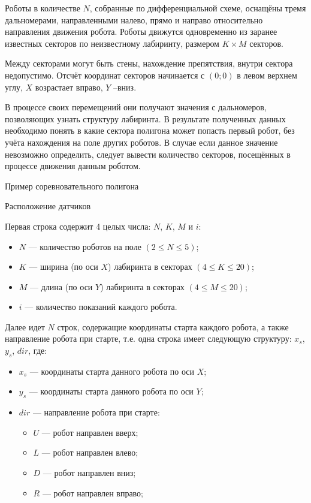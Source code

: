 
Роботы в количестве $N$, собранные по дифференциальной схеме, оснащёны тремя дальномерами, направленными налево, прямо и
направо относительно направления движения робота.
Роботы движутся одновременно  из заранее известных секторов по неизвестному лабиринту, размером $K \times M$ секторов.

Между секторами могут быть стены, нахождение препятствия, внутри сектора недопустимо.
Отсчёт координат секторов начинается с $(0;0)$ в левом верхнем углу, $X$  возрастает вправо, $Y$ --вниз.

В процессе своих перемещений они получают значения с дальномеров, позволяющих узнать структуру лабиринта.
В результате полученных данных необходимо понять в какие сектора полигона может попасть первый робот, без
учёта нахождения на поле других роботов. В случае если данное значение невозможно определить,
следует вывести количество секторов, посещённых в процессе движения данным роботом.

{Пример соревновательного полигона}

{Расположение датчиков}



Первая строка содержит 4 целых числа: $N$, $K$, $M$ и $i$:
\begin{itemize}
    \item $N$ --- количество роботов на поле $(2 \leq N \leq 5)$;
    \item $K$ --- ширина (по оси $X$) лабиринта в секторах $(4 \leq K \leq 20)$;
    \item $M$ --- длина (по оси $Y$) лабиринта в секторах $(4 \leq M \leq 20)$;
    \item $i$ --- количество показаний каждого робота.
\end{itemize}

Далее идет $N$  строк, содержащие координаты старта каждого робота, а также направление робота при старте,
т.е. одна строка имеет следующую структуру: $x_s$, $y_s$, $dir$, где:
\begin{itemize}
    \item $x_s$ --- координаты старта данного робота по оси $X$;
    \item $y_s$ --- координаты старта данного робота по оси $Y$;
    \item $dir$ --- направление робота при старте:
    \begin{itemize}
        \item $U$ --- робот направлен вверх;
        \item $L$ --- робот направлен влево;
        \item $D$ --- робот направлен вниз;
        \item $R$ --- робот направлен вправо;
    \end{itemize}
\end{itemize}

